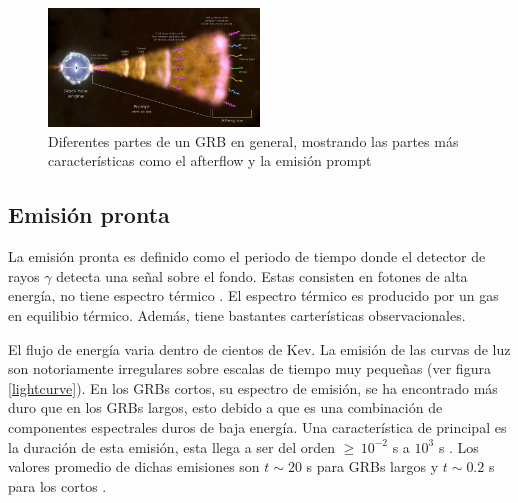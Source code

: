 \documentclass[12pt,a4paper]{book}
\begin{document}
 
 
 \begin{figure} %
  \centering
    \includegraphics[width=0.5\textwidth]{Figuras/Gamma-ray_burst_by_a_blackhole-768x432.jpg}
  \caption{Diferentes partes de un GRB en general, mostrando las partes más características como el afterflow y la emisión prompt}
  \label{fig:Partes de GRBs}
\end{figure}
 

\subsection{Emisión pronta} %
La emisión pronta es definido como el periodo de tiempo donde el detector de rayos $\gamma$ detecta una señal sobre el fondo. Estas consisten en fotones de alta energía, no tiene espectro térmico \cite{GRB:CAP}. El espectro térmico es producido por un gas en equilibio térmico. Además, tiene bastantes carterísticas observacionales.

El flujo de energía varia dentro de cientos de Kev. La emisión de las curvas de luz son notoriamente irregulares sobre escalas de tiempo muy pequeñas \cite{SGRBr-Avanzo}(ver figura \ref{lightcurve}). %
En los GRBs cortos, su espectro de emisión, se ha encontrado más duro que en los GRBs largos, esto debido a que es una combinación de componentes espectrales duros de baja energía. Una característica de principal es la duración de esta emisión, esta llega a ser del orden $\geq \, 10^{-2} $ s a $10^{3}$ s \cite{GRB:PPP}. Los valores promedio de dichas emisiones son $t \sim 20 $ s para GRBs largos y $t \sim 0.2 $ s para los cortos \cite{GRB:PPP}. %
\end{document}
